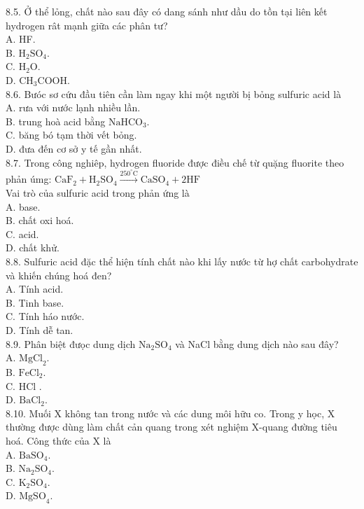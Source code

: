 \documentclass[10pt]{article}
\begin{document}
8.5. Ở thể lỏng, chất nào sau đây có dang sánh như dầu do tồn tại liên kết hydrogen rât mạnh giữa các phân tư?\\
A. HF.\\
B. $\mathrm{H}_{2} \mathrm{SO}_{4}$.\\
C. $\mathrm{H}_{2} \mathrm{O}$.\\
D. $\mathrm{CH}_{3} \mathrm{COOH}$.\\
8.6. Bưóc sơ cứu đầu tiên cần làm ngay khi một người bị bỏng sulfuric acid là\\
A. rưa với nước lạnh nhiều lần.\\
B. trung hoà acid bằng $\mathrm{NaHCO}_{3}$.\\
C. băng bó tạm thời vết bỏng.\\
D. đưa đến cơ sở y tế gần nhất.\\
8.7. Trong công nghiêp, hydrogen fluoride được điều chế từ quặng fluorite theo phản úmg: $\mathrm{CaF}_{2}+\mathrm{H}_{2} \mathrm{SO}_{4} \xrightarrow{250^{\circ} \mathrm{C}} \mathrm{CaSO}_{4}+2 \mathrm{HF}$\\
Vai trò của sulfuric acid trong phản ứng là\\
A. base.\\
B. chất oxi hoá.\\
C. acid.\\
D. chất khử.\\
8.8. Sulfuric acid đặc thể hiện tính chất nào khi lấy nước từ hợ chất carbohydrate và khiến chúng hoá đen?\\
A. Tính acid.\\
B. Tinh base.\\
C. Tính háo nước.\\
D. Tính dễ tan.\\
8.9. Phân biệt đưọc dung dịch $\mathrm{Na}_{2} \mathrm{SO}_{4}$ và NaCl bằng dung dịch nào sau đây?\\
A. $\mathrm{MgCl}_{2}$.\\
B. $\mathrm{FeCl}_{2}$.\\
C. HCl .\\
D. $\mathrm{BaCl}_{2}$.\\
8.10. Muối X không tan trong nước và các dung môi hữu co. Trong y học, X thường được dùng làm chất cản quang trong xét nghiệm X-quang đường tiêu hoá. Công thức của X là\\
A. $\mathrm{BaSO}_{4}$.\\
B. $\mathrm{Na}_{2} \mathrm{SO}_{4}$.\\
C. $\mathrm{K}_{2} \mathrm{SO}_{4}$.\\
D. $\mathrm{MgSO}_{4}$.
\end{document}
